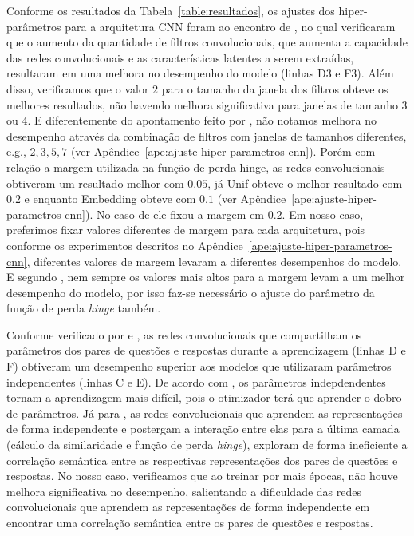 \documentclass[sigconf]{acmart}
\begin{document}
Conforme os resultados da Tabela~\ref{table:resultados}, os ajustes dos hiper-parâmetros para a arquitetura CNN foram ao encontro de \cite{tan-lstm-qa, feng-2015}, no qual verificaram que o aumento da quantidade de filtros convolucionais, que aumenta a capacidade das redes convolucionais e as características latentes a serem extraídas, resultaram em uma melhora no desempenho do modelo (linhas D3 e F3). Além disso, verificamos que o valor $2$ para o tamanho da janela dos filtros obteve os melhores resultados, não havendo melhora significativa para janelas de tamanho $3$ ou $4$. E diferentemente do apontamento feito por \cite{tang-hybrid-deep-representation-2018}, não notamos melhora no desempenho através da combinação de filtros com janelas de tamanhos diferentes, e.g., $2,3,5,7$ (ver Apêndice~\ref{ape:ajuste-hiper-parametros-cnn}). Porém com relação a margem utilizada na função de perda hinge, as redes convolucionais obtiveram um resultado melhor com $0.05$, já Unif obteve o melhor resultado com $0.2$ e enquanto Embedding obteve com $0.1$ (ver Apêndice~\ref{ape:ajuste-hiper-parametros-cnn}). No caso de \cite{tan-lstm-qa} ele fixou a margem em $0.2$. Em nosso caso, preferimos fixar valores diferentes de margem para cada arquitetura, pois conforme os experimentos descritos no Apêndice~\ref{ape:ajuste-hiper-parametros-cnn}, diferentes valores de margem levaram a diferentes desempenhos do modelo. E segundo \cite{park-regarding-margin-loss:2017}, nem sempre os valores mais altos para a margem levam a um melhor desempenho do modelo, por isso faz-se necessário o ajuste do parâmetro da função de perda \textit{hinge} também. 


Conforme verificado por \cite{tan-lstm-qa} e \cite{feng-2015}, as redes convolucionais que compartilham os parâmetros dos pares de questões e respostas durante a aprendizagem (linhas D e F) obtiveram um desempenho superior aos modelos que utilizaram parâmetros independentes (linhas C e E). De acordo com \cite{tan-lstm-qa}, os parâmetros indepdendentes tornam a aprendizagem mais difícil, pois o otimizador terá que aprender o dobro de parâmetros. Já para \cite{wen-joint-modeling-question-answer-2019}, as redes convolucionais que aprendem as representações de forma independente e postergam a interação entre elas para a última camada (cálculo da similaridade e função de perda \textit{hinge}), exploram de forma ineficiente a correlação semântica entre as respectivas representações dos pares de questões e respostas. No nosso caso, verificamos que ao treinar por mais épocas, não houve melhora significativa no desempenho, salientando a dificuldade das redes convolucionais que aprendem as representações de forma independente em encontrar uma correlação semântica entre os pares de questões e respostas.
\end{document}
